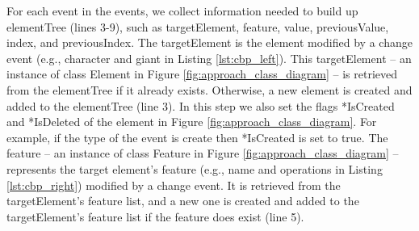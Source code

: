 For each \textsf{event} in the \textsf{events}, we collect information needed to build up \textsf{elementTree}  (lines 3-9), such as \textsf{targetElement}, \textsf{feature}, \textsf{value}, \textsf{previousValue}, \textsf{index}, and \textsf{previousIndex}. The \textsf{targetElement} is the element modified by a change event (e.g., \textsf{character} and \textsf{giant} in Listing \ref{lst:cbp_left}). This \textsf{targetElement} -- an instance of class Element in Figure \ref{fig:approach_class_diagram} -- is retrieved from the \textsf{elementTree} if it already exists. Otherwise, a new element is created and added to the \textsf{elementTree} (line 3). In this step we also set the flags \textsf{*IsCreated} and \textsf{*IsDeleted} of the element in Figure \ref{fig:approach_class_diagram}. For example, if the type of the event is \textsf{create} then \textsf{*IsCreated} is set to \textsf{true}. The \textsf{feature} -- an instance of class Feature in Figure \ref{fig:approach_class_diagram} -- represents the target element's feature (e.g., \textsf{name} and \textsf{operations} in Listing \ref{lst:cbp_right}) modified by a change event. It is retrieved from the \textsf{targetElement}'s feature list, and a new one is created and added to the \textsf{targetElement}'s feature list if the feature does exist (line 5). 

